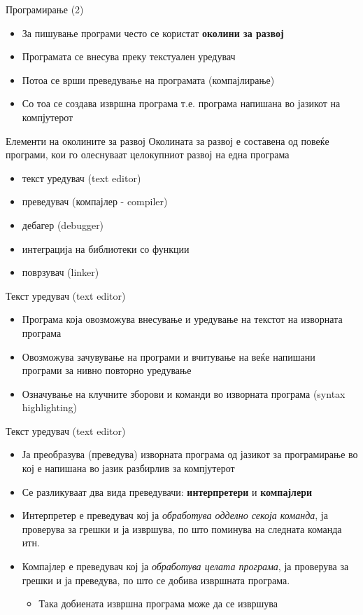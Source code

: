 \begin{frame}{Програмирање (2)}
\begin{itemize}
  \item За пишување програми често се користат \textbf{околини за развој}
  \item Програмата се внесува преку текстуален уредувач
  \item Потоа се врши преведување на програмата (компајлирање)
  \item Со тоа се создава извршна програма т.е. програма
напишана во јазикот на компјутерот
\end{itemize}
\end{frame}

\begin{frame}{Елементи на околините за развој}
Околината за развој е составена од повеќе програми, кои го олеснуваат
целокупниот развој на една програма
\begin{itemize}
  \item текст уредувач (text editor)
  \item преведувач (компајлер - compiler)
  \item дебагер (debugger)
  \item интеграција на библиотеки со функции
  \item поврзувач (linker)
\end{itemize}
\end{frame}

\begin{frame}{Текст уредувач (text editor)}
\begin{itemize}
  \item Програма која овозможува внесување и уредување на текстот на изворната
  програма
  \item Овозможува зачувување на програми и вчитување на веќе напишани програми
  за нивно повторно уредување 
  \item Означување на клучните зборови и команди во изворната програма (syntax
  highlighting)
\end{itemize}
\end{frame}

\begin{frame}{Текст уредувач (text editor)}
\begin{itemize}
  \item Ја преобразува (преведува) изворната програма од јазикот за програмирање во кој е напишана во јазик разбирлив за компјутерот
  \item Се разликуваат два вида преведувачи: \textbf{интерпретери} и \textbf{компајлери} 
  \item Интерпретер е преведувач кој ја \emph{обработува одделно секоја команда}, ја
  проверува за грешки и ја извршува, по што поминува на следната команда  итн.
  \item Компајлер е преведувач кој ја \emph{обработува целата програма}, ја проверува
  за грешки и ја преведува, по што се добива извршната програма.
  \begin{itemize}
  \item Така добиената извршна програма може да се извршува
  \end{itemize}
\end{itemize}
\end{frame}

